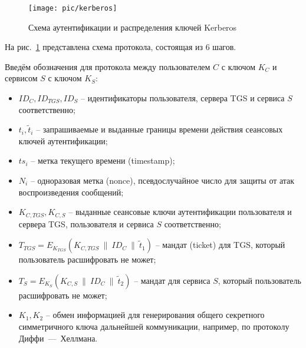 \begin{figure}[!ht]
	\centering
	\texttt{[image: pic/kerberos]}
	\caption{Схема аутентификации и распределения ключей Kerberos\label{fig:kerberos}}
\end{figure}

На рис.~\ref{fig:kerberos} представлена схема протокола, состоящая из 6 шагов.

Введём обозначения для протокола между пользователем $C$ с ключом $K_C$ и сервисом $S$ с ключом $K_S$:
\begin{itemize}
    \item $ID_C, ID_{TGS}, ID_S$ -- идентификаторы пользователя, сервера TGS и сервиса $S$ соответственно;
    \item $t_i, \tilde{t}_i$ -- запрашиваемые и выданные границы времени действия сеансовых ключей аутентификации;
    \item $ts_i$ -- метка текущего времени (timestamp);
    \item $N_i$ -- одноразовая метка (nonce), псевдослучайное число для защиты от атак воспроизведения сообщений;
    \item $K_{C,TGS}, K_{C,S}$ -- выданные сеансовые ключи аутентификации пользователя и сервера TGS, пользователя и сервиса $S$ соответственно;
    \item $T_{TGS} = E_{K_{TGS}}(K_{C,TGS} ~\|~ ID_C ~\|~ \tilde{t}_1)$ -- мандат (ticket) для TGS, который пользователь расшифровать не может;
    \item $T_{S} = E_{K_S}(K_{C,S} ~\|~ ID_C ~\|~ \tilde{t}_2)$ -- мандат для сервиса $S$, который пользователь расшифровать не может;
    \item $K_1, K_2$ -- обмен информацией для генерирования общего секретного симметричного ключа дальнейшей коммуникации, например, по протоколу Диффи~---~Хеллмана.
\end{itemize}

